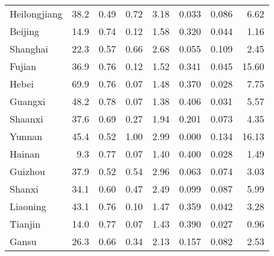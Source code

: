 \begin{tabular}{lrrrrrrr}
 Heilongjiang   &       38.2 &  0.49 &  0.72 &                   3.18 &                          0.033 &                              0.086 &        6.62 \\
 Beijing        &       14.9 &  0.74 &  0.12 &                   1.58 &                          0.320 &                              0.044 &        1.16 \\
 Shanghai       &       22.3 &  0.57 &  0.66 &                   2.68 &                          0.055 &                              0.109 &        2.45 \\
 Fujian         &       36.9 &  0.76 &  0.12 &                   1.52 &                          0.341 &                              0.045 &       15.60 \\
 Hebei          &       69.9 &  0.76 &  0.07 &                   1.48 &                          0.370 &                              0.028 &        7.75 \\
 Guangxi        &       48.2 &  0.78 &  0.07 &                   1.38 &                          0.406 &                              0.031 &        5.57 \\
 Shaanxi        &       37.6 &  0.69 &  0.27 &                   1.94 &                          0.201 &                              0.073 &        4.35 \\
 Yunnan         &       45.4 &  0.52 &  1.00 &                   2.99 &                          0.000 &                              0.134 &       16.13 \\
 Hainan         &        9.3 &  0.77 &  0.07 &                   1.40 &                          0.400 &                              0.028 &        1.49 \\
 Guizhou        &       37.9 &  0.52 &  0.54 &                   2.96 &                          0.063 &                              0.074 &        3.03 \\
 Shanxi         &       34.1 &  0.60 &  0.47 &                   2.49 &                          0.099 &                              0.087 &        5.99 \\
 Liaoning       &       43.1 &  0.76 &  0.10 &                   1.47 &                          0.359 &                              0.042 &        3.28 \\
 Tianjin        &       14.0 &  0.77 &  0.07 &                   1.43 &                          0.390 &                              0.027 &        0.96 \\
 Gansu          &       26.3 &  0.66 &  0.34 &                   2.13 &                          0.157 &                              0.082 &        2.53 \\

\end{tabular}
